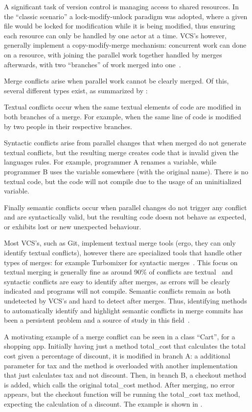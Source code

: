 A significant task of version control is managing access to shared resources.
In the ``classic scenario'' a lock-modify-unlock paradigm was adopted, where a given file would be locked for modification while it is being modified, thus ensuring each resource can only be handled by one actor at a time. VCS's however, generally implement a copy-modify-merge mechanism: concurrent work can done on a resource, with joining the parallel work together handled by merges afterwards, with two ``branches'' of work merged into one~\cite{kn:vers_ott}.

Merge conflicts arise when parallel work cannot be clearly merged. Of this, several different types exist, as summarized by \citet{kn:tmens}:

Textual conflicts occur when the same textual elements of code are modified in both branches of a merge. For example, when the same line of code is modified by two people in their respective branches.

Syntactic conflicts arise from parallel changes that when merged do not generate textual conflicts, but the resulting merge creates code that is invalid given the languages rules. For example, programmer A renames a variable, while programmer B uses the variable somewhere (with the original name). There is no textual code, but the code will not compile due to the usage of an uninitialized variable.

Finally semantic conflicts occur when parallel changes do not trigger any conflict and are syntactically valid, but the resulting code doesn not behave as expected, or exhibits lost or new unexpected behaviour.

Most VCS's, such as Git, implement textual merge tools (ergo, they can only identify textual conflicts), however there are specialized tools that handle other types of merges: for example Turbomixer for syntactic merges~\cite{kn:tmens}. This focus on textual merging is generally fine as around 90\% of conflicts are textual~\cite{kn:lcsd} and syntactic conflicts are easy to identify after merges, as errors will be clearly indicated and programs will not compile.
Semantic conflicts remain as both undetected by VCS's and hard to detect after merges. Thus, identifying methods to automatically identify and highlight semantic conflicts in merge commits has been a persistent problem and a source of study in this field~\cite{kn:nuno,kn:leuson,kn:leuson2}.


A motivating example of a merge conflict can be seen in a class ``Cart'', for a shopping app. Initially having just a method total\_cost that calculates the total cost given a percentage of discount, it is modified in branch A: a additional parameter for tax and the method is overloaded with another implementation that just calculates tax and not discount. Then, in branch B, a checkout method is added, which calls the original total\_cost method. After merging, no error appears, but the checkout function will be running the total\_cost tax method, expecting the calculation of a discount. The example is shown in .

